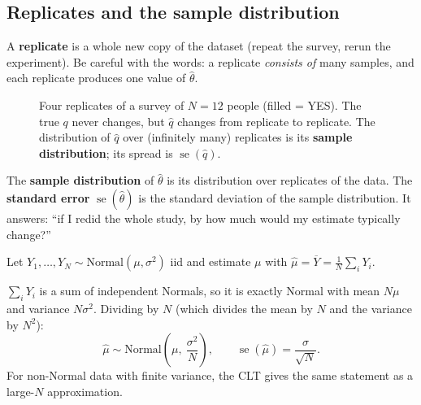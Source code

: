 \documentclass[11pt]{article}
\newcommand{\se}{\operatorname{se}}
\newcommand{\Norm}{\text{Normal}}
\newcommand{\Ybar}{\overline{Y}}
\begin{document}
\subsection{Replicates and the sample distribution}
A \textbf{replicate} is a whole new copy of the dataset (repeat the survey, rerun the experiment). Be careful with the words: a replicate
\emph{consists of} many samples, and each replicate produces one value of $\hat\theta$.

\begin{figure}[h]
\centering
{}
\caption{Four replicates of a survey of $N=12$ people (filled = YES). The true $q$ never changes, but $\hat q$ changes from replicate to
replicate. The distribution of $\hat q$ over (infinitely many) replicates is its \textbf{sample distribution}; its spread is $\se(\hat q)$.}
\end{figure}

\begin{keybox}[title={Sample distribution and standard error}]
The \textbf{sample distribution} of $\hat\theta$ is its distribution over replicates of the data. The \textbf{standard error}
$\se(\hat\theta)$ is the standard deviation of the sample distribution. It answers: ``if I redid the whole study, by how much would my
estimate typically change?''
\end{keybox}

\begin{examplebox}[title={Example: the sample distribution of a Normal mean}]
Let $Y_1,\dots,Y_N\sim\Norm(\mu,\sigma^2)$ iid and estimate $\mu$ with $\hat\mu=\Ybar=\frac1N\sum_iY_i$.

$\sum_iY_i$ is a sum of independent Normals, so it is exactly Normal with mean $N\mu$ and variance $N\sigma^2$. Dividing by $N$ (which
divides the mean by $N$ and the variance by $N^2$):
\[
\hat\mu\sim\Norm\!\left(\mu,\ \frac{\sigma^2}{N}\right),\qquad \se(\hat\mu)=\frac{\sigma}{\sqrt N}.
\]
For non-Normal data with finite variance, the CLT gives the same statement as a large-$N$ approximation.
\end{examplebox}
\end{document}
